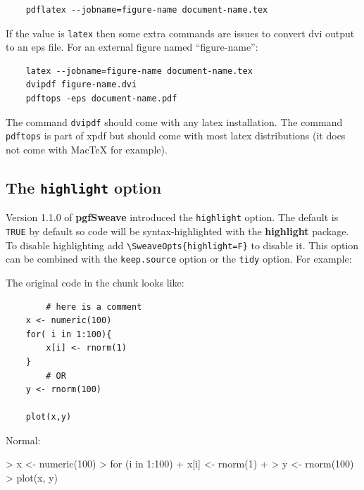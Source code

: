 \documentclass{article}
\newcommand{\code}{\texttt}
\newcommand{\pkg}{\textbf}
\begin{document}
\begin{Verbatim}
    pdflatex --jobname=figure-name document-name.tex
\end{Verbatim}

If the value is \code{latex} then some extra commands are issues to convert dvi output to an eps file. For an external figure named ``figure-name'':

\begin{Verbatim}
    latex --jobname=figure-name document-name.tex
    dvipdf figure-name.dvi
    pdftops -eps document-name.pdf
\end{Verbatim}

The command \code{dvipdf} should come with any latex installation. The command \code{pdftops} is part of xpdf but should come with most latex distributions (it does not come with MacTeX for example).

\subsection{The \code{highlight} option}
Version 1.1.0 of \pkg{pgfSweave} introduced the \code{highlight} option.  The default is \code{TRUE} by default so code will be syntax-highlighted with the \pkg{highlight} package. To disable highlighting add \code{\textbackslash SweaveOpts\{highlight=F\}} to disable it. This option can be combined with the \code{keep.source} option or the \code{tidy} option.  For example:

The original code in the chunk looks like:

\begin{Verbatim}
        # here is a comment
    x <- numeric(100)
    for( i in 1:100){
        x[i] <- rnorm(1)
    }
        # OR
    y <- rnorm(100)
    
    plot(x,y)
\end{Verbatim}

Normal:
\begin{Schunk}
\begin{Sinput}
> x <- numeric(100)
> for (i in 1:100) {
+     x[i] <- rnorm(1)
+ }
> y <- rnorm(100)
> plot(x, y)
\end{Sinput}
\end{Schunk}
\end{document}
